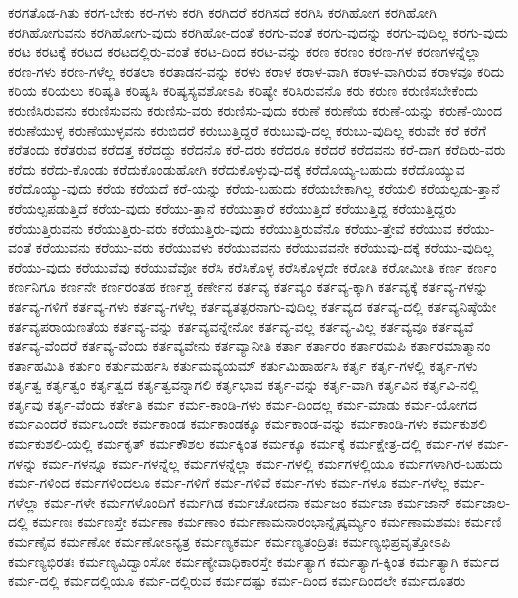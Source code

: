 {ಕರಗತೊಡ-ಗಿತು
ಕರಗ-ಬೇಕು
ಕರ-ಗಳು
ಕರಗಿ
ಕರಗಿದರೆ
ಕರಗಿಸದೆ
ಕರಗಿಸಿ
ಕರಗಿಹೋಗ
ಕರಗಿಹೋಗಿ
ಕರಗಿಹೋಗುವನು
ಕರಗಿಹೋಗು-ವುದು
ಕರಗಿಹೋ-ದಂತೆ
ಕರಗು-ವಂತೆ
ಕರಗು-ವುದನ್ನು
ಕರಗು-ವುದಿಲ್ಲ
ಕರಗು-ವುದು
ಕರಟ
ಕರಟಕ್ಕೆ
ಕರಟದ
ಕರಟದಲ್ಲಿರು-ವಂತೆ
ಕರಟ-ದಿಂದ
ಕರಟ-ವನ್ನು
ಕರಣ
ಕರಣಂ
ಕರಣ-ಗಳ
ಕರಣಗಳನ್ನೆಲ್ಲಾ
ಕರಣ-ಗಳು
ಕರಣ-ಗಳೆಲ್ಲ
ಕರತಲಾ
ಕರತಾಡನ-ವನ್ನು
ಕರಳು
ಕರಾಳ
ಕರಾಳ-ವಾಗಿ
ಕರಾಳ-ವಾಗಿರುವ
ಕರಾಳವೂ
ಕರಿದು
ಕರಿಯ
ಕರಿಯಲು
ಕರಿಷ್ಯತಿ
ಕರಿಷ್ಯಸಿ
ಕರಿಷ್ಯಸ್ಯವಶೋಽಪಿ
ಕರಿಷ್ಯೇ
ಕರಿಸಿರುವನೊ
ಕರು
ಕರುಣ
ಕರುಣಿಸಬೇಕೆಂದು
ಕರುಣಿಸಿರುವನು
ಕರುಣಿಸುವನು
ಕರುಣಿಸು-ವರು
ಕರುಣಿಸು-ವುದು
ಕರುಣೆ
ಕರುಣೆಯ
ಕರುಣೆ-ಯನ್ನು
ಕರುಣೆ-ಯಿಂದ
ಕರುಣೆಯುಳ್ಳ
ಕರುಣೆಯುಳ್ಳವನು
ಕರುಬಿದರೆ
ಕರುಬುತ್ತಿದ್ದರೆ
ಕರುಬುವು-ದಲ್ಲ
ಕರುಬು-ವುದಿಲ್ಲ
ಕರುವೇ
ಕರೆ
ಕರೆಗೆ
ಕರೆತಂದು
ಕರೆತರುವ
ಕರೆದತ್ತ
ಕರೆದದ್ದು
ಕರೆದನೊ
ಕರೆ-ದರು
ಕರೆದರೂ
ಕರೆದರೆ
ಕರೆದವನು
ಕರೆ-ದಾಗ
ಕರೆದಿರು-ವರು
ಕರೆದು
ಕರೆದು-ಕೊಂಡು
ಕರೆದುಕೊಂಡುಹೋಗಿ
ಕರೆದುಕೊಳ್ಳುವು-ದಕ್ಕೆ
ಕರೆದೊಯ್ಯ-ಬಹುದು
ಕರೆದೊಯ್ಯುವ
ಕರೆದೊಯ್ಯು-ವುದು
ಕರೆಯ
ಕರೆಯದೆ
ಕರೆ-ಯನ್ನು
ಕರೆಯ-ಬಹುದು
ಕರೆಯಬೇಕಾಗಿಲ್ಲ
ಕರೆಯಲಿ
ಕರೆಯಲ್ಪಡು-ತ್ತಾನೆ
ಕರೆಯಲ್ಪಪಡುತ್ತಿದೆ
ಕರೆಯ-ವುದು
ಕರೆಯು-ತ್ತಾನೆ
ಕರೆಯುತ್ತಾರೆ
ಕರೆಯುತ್ತಿದೆ
ಕರೆಯುತ್ತಿದ್ದ
ಕರೆಯುತ್ತಿದ್ದರು
ಕರೆಯುತ್ತಿರುವನು
ಕರೆಯುತ್ತಿರು-ವರು
ಕರೆಯುತ್ತಿರು-ವುದು
ಕರೆಯುತ್ತಿರುವೆನೊ
ಕರೆಯು-ತ್ತೇವೆ
ಕರೆಯುವ
ಕರೆಯು-ವಂತೆ
ಕರೆಯುವನು
ಕರೆಯು-ವರು
ಕರೆಯುವಳು
ಕರೆಯುವವನು
ಕರೆಯುವವನೇ
ಕರೆಯುವು-ದಕ್ಕೆ
ಕರೆಯು-ವುದಿಲ್ಲ
ಕರೆಯು-ವುದು
ಕರೆಯುವೆವು
ಕರೆಯುವೆವೋ
ಕರೆಸಿ
ಕರೆಸಿಕೊಳ್ಳ
ಕರೆಸಿಕೊಳ್ಳದೇ
ಕರೋತಿ
ಕರೋಮೀತಿ
ಕರ್ಣ
ಕರ್ಣಂ
ಕರ್ಣನಿಗೂ
ಕರ್ಣನೇ
ಕರ್ಣರಂತಹ
ಕರ್ಣಶ್ಚ
ಕರ್ಣೇನ
ಕರ್ತವ್ಯ
ಕರ್ತವ್ಯಂ
ಕರ್ತವ್ಯ-ಕ್ಕಾಗಿ
ಕರ್ತವ್ಯಕ್ಕೆ
ಕರ್ತವ್ಯ-ಗಳನ್ನು
ಕರ್ತವ್ಯ-ಗಳಿಗೆ
ಕರ್ತವ್ಯ-ಗಳು
ಕರ್ತವ್ಯ-ಗಳೆಲ್ಲ
ಕರ್ತವ್ಯತತ್ಪರನಾಗು-ವುದಿಲ್ಲ
ಕರ್ತವ್ಯದ
ಕರ್ತವ್ಯ-ದಲ್ಲಿ
ಕರ್ತವ್ಯನಿಷ್ಠೆಯೇ
ಕರ್ತವ್ಯಪರಾಯಣತೆಯ
ಕರ್ತವ್ಯ-ವನ್ನು
ಕರ್ತವ್ಯವನ್ನೇನೋ
ಕರ್ತವ್ಯ-ವಲ್ಲ
ಕರ್ತವ್ಯ-ವಿಲ್ಲ
ಕರ್ತವ್ಯವೂ
ಕರ್ತವ್ಯವೆ
ಕರ್ತವ್ಯ-ವೆಂದರೆ
ಕರ್ತವ್ಯ-ವೆಂದು
ಕರ್ತವ್ಯವೇನು
ಕರ್ತವ್ಯಾನೀತಿ
ಕರ್ತಾ
ಕರ್ತಾರಂ
ಕರ್ತಾರಮಪಿ
ಕರ್ತಾರಮಾತ್ಮಾನಂ
ಕರ್ತಾಹಮಿತಿ
ಕರ್ತುಂ
ಕರ್ತುಮರ್ಹಸಿ
ಕರ್ತುಮವ್ಯಯಮ್
ಕರ್ತುಮಿಹಾರ್ಹಸಿ
ಕರ್ತೃ
ಕರ್ತೃ-ಗಳಲ್ಲಿ
ಕರ್ತೃ-ಗಳು
ಕರ್ತೃತ್ವ
ಕರ್ತೃತ್ವಂ
ಕರ್ತೃತ್ವದ
ಕರ್ತೃತ್ವವನ್ನಾಗಲಿ
ಕರ್ತೃಭಾವ
ಕರ್ತೃ-ವನ್ನು
ಕರ್ತೃ-ವಾಗಿ
ಕರ್ತೃವಿನ
ಕರ್ತೃವಿ-ನಲ್ಲಿ
ಕರ್ತೃವು
ಕರ್ತೃ-ವೆಂದು
ಕರ್ತೇತಿ
ಕರ್ಮ
ಕರ್ಮ-ಕಾಂಡಿ-ಗಳು
ಕರ್ಮ-ದಿಂದಲ್ಲ
ಕರ್ಮ-ಮಾಡು
ಕರ್ಮ-ಯೋಗದ
ಕರ್ಮಎಂದರೆ
ಕರ್ಮಒಂದೇ
ಕರ್ಮಕಾಂಡ
ಕರ್ಮಕಾಂಡಕ್ಕೂ
ಕರ್ಮಕಾಂಡ-ವನ್ನು
ಕರ್ಮಕಾಂಡಿ-ಗಳು
ಕರ್ಮಕುಶಲಿ
ಕರ್ಮಕುಶಲಿ-ಯಲ್ಲಿ
ಕರ್ಮಕೃತ್
ಕರ್ಮಕೌಶಲ
ಕರ್ಮಕ್ಕಿಂತ
ಕರ್ಮಕ್ಕೂ
ಕರ್ಮಕ್ಕೆ
ಕರ್ಮಕ್ಷೇತ್ರ-ದಲ್ಲಿ
ಕರ್ಮ-ಗಳ
ಕರ್ಮ-ಗಳನ್ನು
ಕರ್ಮ-ಗಳನ್ನೂ
ಕರ್ಮ-ಗಳನ್ನೆಲ್ಲ
ಕರ್ಮಗಳನ್ನೆಲ್ಲಾ
ಕರ್ಮ-ಗಳಲ್ಲಿ
ಕರ್ಮಗಳಲ್ಲಿಯೂ
ಕರ್ಮಗಳಾಗಿರ-ಬಹುದು
ಕರ್ಮ-ಗಳಿಂದ
ಕರ್ಮಗಳಿಂದಲೂ
ಕರ್ಮ-ಗಳಿಗೆ
ಕರ್ಮ-ಗಳಿವೆ
ಕರ್ಮ-ಗಳು
ಕರ್ಮ-ಗಳೂ
ಕರ್ಮ-ಗಳೆಲ್ಲ
ಕರ್ಮ-ಗಳೆಲ್ಲಾ
ಕರ್ಮ-ಗಳೇ
ಕರ್ಮಗಳೊಂದಿಗೆ
ಕರ್ಮಗಿಡ
ಕರ್ಮಚೋದನಾ
ಕರ್ಮಜಂ
ಕರ್ಮಜಾ
ಕರ್ಮಜಾನ್
ಕರ್ಮಜಾಲ-ದಲ್ಲಿ
ಕರ್ಮಣಃ
ಕರ್ಮಣಸ್ತೇ
ಕರ್ಮಣಾ
ಕರ್ಮಣಾಂ
ಕರ್ಮಣಾಮನಾರಂಭಾನ್ನೈಷ್ಕರ್ಮ್ಯಂ
ಕರ್ಮಣಾಮಶಮಃ
ಕರ್ಮಣಿ
ಕರ್ಮಣೈವ
ಕರ್ಮಣೋ
ಕರ್ಮಣೋಽನ್ಯತ್ರ
ಕರ್ಮಣ್ಯಕರ್ಮ
ಕರ್ಮಣ್ಯತಂದ್ರಿತಃ
ಕರ್ಮಣ್ಯಭಿಪ್ರವೃತ್ತೋಽಪಿ
ಕರ್ಮಣ್ಯಭಿರತಃ
ಕರ್ಮಣ್ಯವಿದ್ವಾಂಸೋ
ಕರ್ಮಣ್ಯೇವಾಧಿಕಾರಸ್ತೇ
ಕರ್ಮತ್ಯಾಗ
ಕರ್ಮತ್ಯಾಗ-ಕ್ಕಿಂತ
ಕರ್ಮತ್ಯಾಗಿ
ಕರ್ಮದ
ಕರ್ಮ-ದಲ್ಲಿ
ಕರ್ಮದಲ್ಲಿಯೂ
ಕರ್ಮ-ದಲ್ಲಿರುವ
ಕರ್ಮದಷ್ಟು
ಕರ್ಮ-ದಿಂದ
ಕರ್ಮದಿಂದಲೇ
ಕರ್ಮದೂತರು
}
